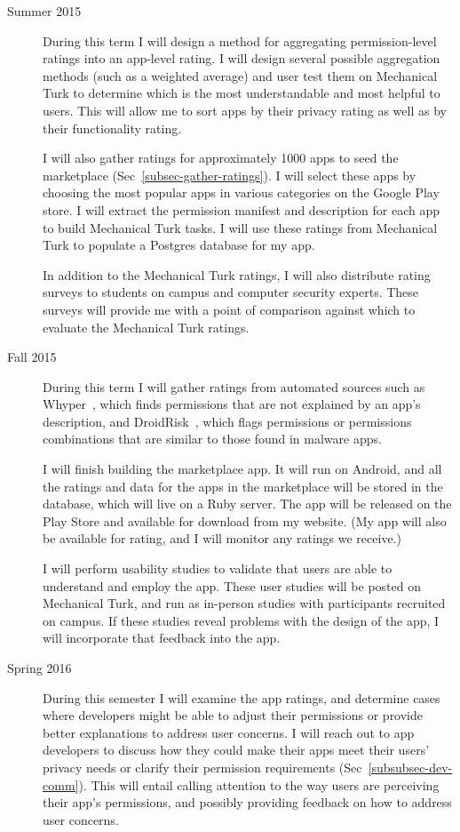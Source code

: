 \documentclass[11pt]{article}
\begin{document}
\begin{description}

\item[Summer 2015]
During this term I will design a method for aggregating 
permission-level ratings into an app-level rating. I will 
design several possible aggregation methods (such as a 
weighted average) and user test them on Mechanical
Turk to determine which is the most understandable and most
helpful to users. This will allow me to sort apps by their privacy 
rating as well as by their functionality rating.

I will also gather ratings for approximately 1000 apps to seed 
the marketplace (Sec~\ref{subsec-gather-ratings}). I will select these
apps by choosing the most popular apps in various categories on 
the Google Play store. I will extract the permission manifest and 
description for each app to build Mechanical Turk tasks. I will 
use these ratings from Mechanical Turk to populate a Postgres database 
for my app.

In addition to the Mechanical Turk ratings, I will also distribute
rating surveys to students on campus and computer security experts.
These surveys will provide me with a point of comparison against 
which to evaluate the Mechanical Turk ratings. 

\item[Fall 2015]

During this term I will gather ratings from automated sources 
such as Whyper~\cite{whyper-SEC13}, which finds permissions 
that are not explained by an app's description, and 
DroidRisk~\cite{droidrisk-2013}, which flags permissions or 
permissions combinations that are similar to those found in 
malware apps.

I will finish building the marketplace app. It 
will run on Android, and all the ratings and data for the apps in
the marketplace will be 
stored in the database, which will live on a Ruby server. The app 
will be released on the Play Store and available for download 
from my website. (My app will also be available for rating, 
and I will monitor any ratings we receive.)

I will perform usability studies to validate that users are able 
to understand and employ the app. These user studies will be posted
on Mechanical Turk, and run as in-person studies with participants
recruited on campus. If these studies reveal problems with the 
design of the app, I will incorporate that feedback into the app.

\item[Spring 2016] 
During this semester I will examine the app ratings, and determine 
cases where developers might be able to adjust their permissions
or provide better explanations to address user concerns. I will 
reach out to app developers to discuss how they could make their 
apps meet their users' privacy needs or clarify their permission 
requirements (Sec~\ref{subsubsec-dev-comm}). 
This will entail calling attention to the way users are perceiving 
their app's permissions, and possibly providing feedback on how
to address user concerns.

\end{description}
\end{document}

